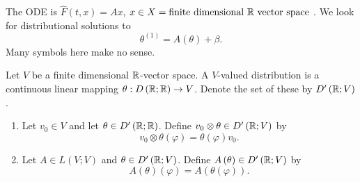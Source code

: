 The ODE is $\hat{F} \left( t, x \right)  = Ax$, $x \in  X = \text{finite dimensional }\mathbb{R} \text{ vector space }$. 
We look for distributional solutions to 
\[
	\theta ^{\left( 1 \right) } = A\left( \theta \right) + \beta
.\] 
Many symbols here make no sense. 
\begin{definition}
	Let $V$ be a finite dimensional $\mathbb{R}$-vector space. A $ V$-valued distribution is a continuous linear mapping $\theta : D\left( \mathbb{R}; \mathbb{R} \right)  \to V$. Denote the set of these by $D'\left( \mathbb{R}; V \right) $. 
\end{definition}

\begin{eg}
	\begin{enumerate}
		\item Let $v_0 \in  V$ and let $\theta \in  D'\left( \mathbb{R}; \mathbb{R} \right) $. Define $v_0 \otimes \theta \in  D'\left( \mathbb{R}; V \right) $ by 
			 \[
				 v_0 \otimes \theta \left( \varphi \right) = \theta \left( \varphi \right) v_0
			.\] 
		\item Let $A \in L \left( V; V \right) $ and $\theta \in  D'\left( \mathbb{R}; V \right) $. Define $A\left( \theta \right) \in  D'\left( \mathbb{R}; V\right) $ by 
			\[
				A\left( \theta  \right) \left( \varphi \right)  = A\left( \theta\left( \varphi \right)  \right) 
			.\] 
	\end{enumerate}
\end{eg}
